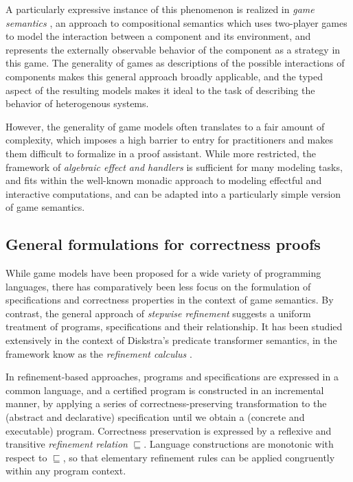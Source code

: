 \documentclass[sigplan,10pt,review,anonymous]{acmart}
\begin{document}
A particularly expressive instance of this phenomenon
is realized in \emph{game semantics} \cite{cspgs},
an approach to compositional semantics
which uses two-player games to model
the interaction between a component and its environment,
and represents the externally observable behavior
of the component as a strategy in this game.
The generality of games as
descriptions of the possible interactions of components
makes this general approach broadly applicable,
and the typed aspect of the resulting models
makes it ideal to the task of
describing the behavior of heterogenous systems.

However,
the generality of game models
often translates to a fair amount of complexity,
which imposes a high barrier to entry for practitioners
and makes them difficult to formalize in a proof assistant.
While more restricted,
the framework of \emph{algebraic effect and handlers} \cite{eff}
is sufficient for many modeling tasks,
and fits within the well-known monadic approach
to modeling effectful and interactive computations,
and can be adapted into a particularly simple version
of game semantics.

\subsection{General formulations for correctness proofs}

While game models have been proposed
for a wide variety of programming languages,
there has comparatively been less focus
on the formulation of specifications and correctness properties
in the context of game semantics.
By contrast,
the general approach of \emph{stepwise refinement}
suggests a uniform treatment of programs, specifications
and their relationship.
It has been studied extensively in the context of
Diskstra's predicate transformer semantics,
in the framework know as the \emph{refinement calculus} \cite{refcal}.

In refinement-based approaches,
programs and specifications are expressed in a common language,
and a certified program is constructed in an incremental manner,
by applying a series of correctness-preserving transformation
to the (abstract and declarative) specification
until we obtain a (concrete and executable) program.
Correctness preservation is expressed
by a reflexive and transitive \emph{refinement relation} $\sqsubseteq$.
Language constructions are monotonic with respect to $\sqsubseteq$,
so that elementary refinement rules
can be applied congruently within any program context.
\end{document}
